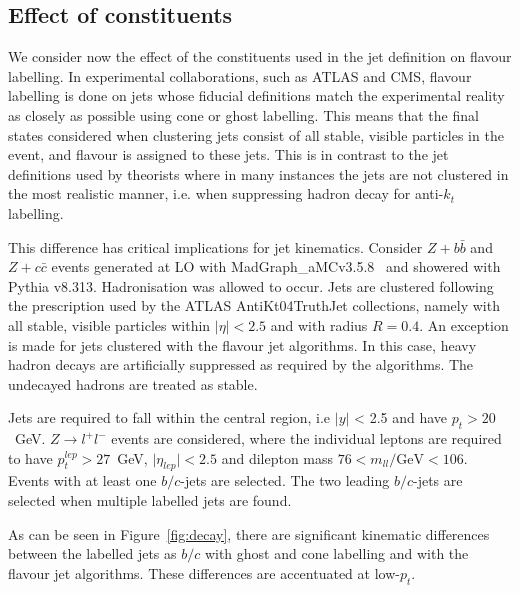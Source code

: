 \documentclass[10pt,a4paper]{book}
\begin{document}
\subsection{Effect of constituents}
\label{eo constituents}
We consider now the effect of the constituents used in the jet definition on flavour labelling. In experimental collaborations, such as ATLAS and CMS, flavour labelling is done on jets whose fiducial definitions match the experimental reality as closely as possible using cone or ghost labelling. This means that the final states considered when clustering jets consist of all stable, visible particles in the event, and flavour is assigned to these jets. This is in contrast to the jet definitions used by theorists where in many instances the jets are not clustered in the most realistic manner, i.e. when suppressing hadron decay for anti-$k_t$ labelling. 

This difference has critical implications for jet kinematics. Consider $Z+b\bar{b}$ and $Z+c\bar{c}$ events generated at LO with MadGraph\_aMC\@NLO v3.5.8~\cite{Alwall:2014hca} and showered with Pythia v8.313. Hadronisation was allowed to occur. Jets are clustered following the prescription used by the ATLAS AntiKt04TruthJet collections, namely with all stable, visible particles within $\vert \eta \vert < 2.5$ and with radius $R = 0.4$. An exception is made for jets clustered with the flavour jet algorithms. In this case, heavy hadron decays are artificially suppressed as required by the algorithms. The undecayed hadrons are treated as stable.

Jets are required to fall within the central region, i.e $\vert y \vert $ < 2.5 and have $p_t > 20$~GeV. $Z\rightarrow l^+l^-$ events are considered, where the individual leptons are required to have $p_t^{lep} > 27$~GeV, $\vert \eta_{lep} \vert < 2.5$ and dilepton mass $76 < m_{ll}/\text{GeV} < 106$. Events with at least one $b/c$-jets are selected. The two leading $b/c$-jets are selected when multiple labelled jets are found.   

As can be seen in Figure~\ref{fig:decay}, there are significant kinematic differences between the labelled jets as $b/c$ with ghost and cone labelling and with the flavour jet algorithms. These differences are accentuated at low-$p_t$.
\end{document}
